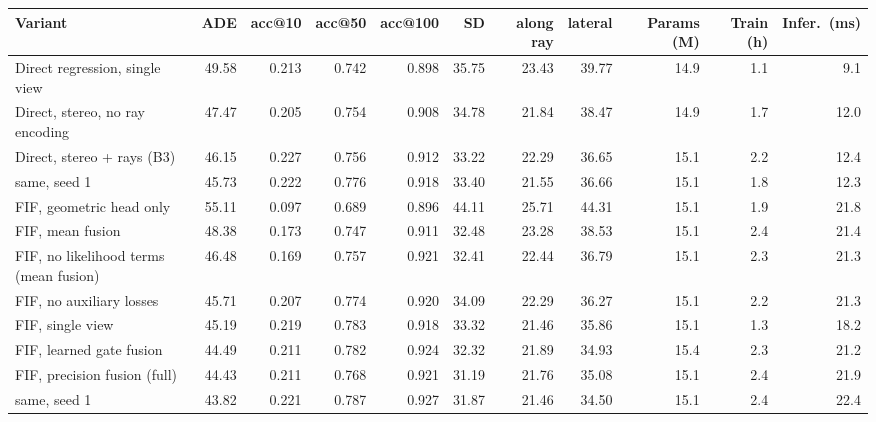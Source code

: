 \footnotesize\setlength{\tabcolsep}{4pt}
\begin{tabular}{@{}lrrrrrrrrrr@{}}
\toprule
Variant & ADE & acc@10 & acc@50 & acc@100 & SD & along ray & lateral & Params (M) & Train (h) & Infer.\ (ms) \\
\midrule
Direct regression, single view & 49.58 & 0.213 & 0.742 & 0.898 & 35.75 & 23.43 & 39.77 & 14.9 & 1.1 & 9.1 \\
Direct, stereo, no ray encoding & 47.47 & 0.205 & 0.754 & 0.908 & 34.78 & 21.84 & 38.47 & 14.9 & 1.7 & 12.0 \\
Direct, stereo + rays (B3) & 46.15 & 0.227 & 0.756 & 0.912 & 33.22 & 22.29 & 36.65 & 15.1 & 2.2 & 12.4 \\
\quad same, seed 1 & 45.73 & 0.222 & 0.776 & 0.918 & 33.40 & 21.55 & 36.66 & 15.1 & 1.8 & 12.3 \\
FIF, geometric head only & 55.11 & 0.097 & 0.689 & 0.896 & 44.11 & 25.71 & 44.31 & 15.1 & 1.9 & 21.8 \\
FIF, mean fusion & 48.38 & 0.173 & 0.747 & 0.911 & 32.48 & 23.28 & 38.53 & 15.1 & 2.4 & 21.4 \\
FIF, no likelihood terms (mean fusion) & 46.48 & 0.169 & 0.757 & 0.921 & 32.41 & 22.44 & 36.79 & 15.1 & 2.3 & 21.3 \\
FIF, no auxiliary losses & 45.71 & 0.207 & 0.774 & 0.920 & 34.09 & 22.29 & 36.27 & 15.1 & 2.2 & 21.3 \\
FIF, single view & 45.19 & 0.219 & 0.783 & 0.918 & 33.32 & 21.46 & 35.86 & 15.1 & 1.3 & 18.2 \\
FIF, learned gate fusion & 44.49 & 0.211 & 0.782 & 0.924 & 32.32 & 21.89 & 34.93 & 15.4 & 2.3 & 21.2 \\
FIF, precision fusion (full) & 44.43 & 0.211 & 0.768 & 0.921 & 31.19 & 21.76 & 35.08 & 15.1 & 2.4 & 21.9 \\
\quad same, seed 1 & 43.82 & 0.221 & 0.787 & 0.927 & 31.87 & 21.46 & 34.50 & 15.1 & 2.4 & 22.4 \\
\bottomrule
\end{tabular}

